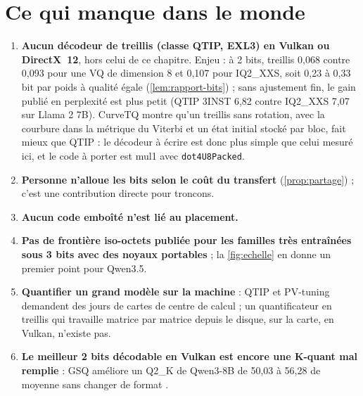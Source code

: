 \section{Ce qui manque dans le monde}

\begin{enumerate}
\item \textbf{Aucun décodeur de treillis (classe QTIP, EXL3) en Vulkan ou DirectX~12}, hors celui de ce chapitre. Enjeu \calc : à 2 bits, treillis 0,068 contre 0,093 pour une VQ de dimension 8 et 0,107 pour IQ2\_XXS, soit 0,23 à 0,33 bit par poids à qualité égale (\cref{lem:rapport-bits}) ; sans ajustement fin, le gain publié en perplexité est plus petit (QTIP 3INST 6,82 contre IQ2\_XXS 7,07 sur Llama 2 7B). CurveTQ montre qu'un treillis sans rotation, avec la courbure dans la métrique du Viterbi et un état initial stocké par bloc, fait mieux que QTIP : le décodeur à écrire est donc plus simple que celui mesuré ici, et le code à porter est mul1 avec \texttt{dot4U8Packed}.
\item \textbf{Personne n'alloue les bits selon le coût du transfert} (\cref{prop:partage}) ; c'est une contribution directe pour troncons.
\item \textbf{Aucun code emboîté n'est lié au placement.}
\item \textbf{Pas de frontière iso-octets publiée pour les familles très entraînées sous 3 bits avec des noyaux portables} ; la \cref{fig:echelle} en donne un premier point pour Qwen3.5.
\item \textbf{Quantifier un grand modèle sur la machine} : QTIP et PV-tuning demandent des jours de cartes de centre de calcul ; un quantificateur en treillis qui travaille matrice par matrice depuis le disque, sur la carte, en Vulkan, n'existe pas.
\item \textbf{Le meilleur 2 bits décodable en Vulkan est encore une K-quant mal remplie} : GSQ améliore un Q2\_K de Qwen3-8B de 50,03 à 56,28 de moyenne sans changer de format \litt.
\end{enumerate}

